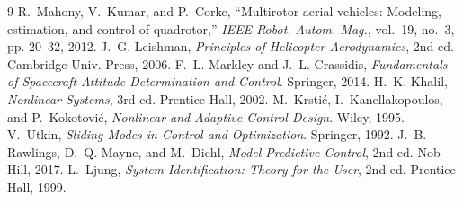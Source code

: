 \documentclass[conference]{IEEEtran}
\begin{document}

\begin{thebibliography}{9}
 R.~Mahony, V.~Kumar, and P.~Corke, ``Multirotor aerial vehicles: Modeling, estimation, and control of quadrotor,'' \emph{IEEE Robot. Autom. Mag.}, vol.~19, no.~3, pp. 20--32, 2012.
 J.~G. Leishman, \emph{Principles of Helicopter Aerodynamics}, 2nd ed. Cambridge Univ. Press, 2006.
 F.~L. Markley and J.~L. Crassidis, \emph{Fundamentals of Spacecraft Attitude Determination and Control}. Springer, 2014.
 H.~K. Khalil, \emph{Nonlinear Systems}, 3rd ed. Prentice Hall, 2002.
 M.~Krsti\'c, I.~Kanellakopoulos, and P.~Kokotovi\'c, \emph{Nonlinear and Adaptive Control Design}. Wiley, 1995.
 V.~Utkin, \emph{Sliding Modes in Control and Optimization}. Springer, 1992.
 J.~B. Rawlings, D.~Q. Mayne, and M.~Diehl, \emph{Model Predictive Control}, 2nd ed. Nob Hill, 2017.
 L.~Ljung, \emph{System Identification: Theory for the User}, 2nd ed. Prentice Hall, 1999.
\end{thebibliography}
\end{document}

